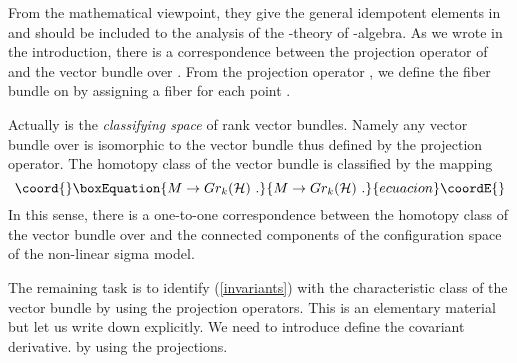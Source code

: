 \documentclass[a4paper,12pt]{article}
\begin{document}
{}From the mathematical viewpoint,
they give the general idempotent elements
in \coordHE{}
and should be included to the analysis of the \coordHE{}-theory
of \coordHE{}-algebra.
As we wrote in the introduction, there is a correspondence
between the projection operator of \coordHE{}
and the vector bundle over \coordHE{}. From the projection operator
\myHighlight{$\Pi$}\coordHE{}, we define the fiber bundle on \coordHE{} by
assigning a fiber \coordHE{} for each point \coordHE{}.

Actually \coordHE{} is the {\em classifying space}
of rank \coordHE{} vector bundles.  Namely
any vector bundle over \coordHE{} is isomorphic to
the vector bundle thus defined by the projection
operator. The homotopy class of the vector bundle
is classified by the mapping
\begin{equation}\coord{}\boxEquation{
 M\rightarrow Gr_k(\cH)\,\,.
}{
 M\rightarrow Gr_k(\cH)\,\,.
}{ecuacion}\coordE{}\end{equation}
In this sense, there is a one-to-one correspondence between
the homotopy class of the vector bundle over \coordHE{} and
the connected components of the configuration
space of the non-linear sigma model.

The remaining task is to identify (\ref{invariants})
with the characteristic class of the vector bundle
by using the projection operators.
This is an elementary material but let us write down
explicitly. We need to introduce define the covariant derivative.
by using the projections.
\end{document}

